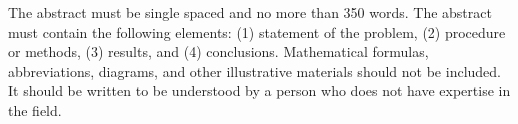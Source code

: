 The abstract must be single spaced and no more than 350 words. The abstract must contain the following elements: (1) statement of the problem, (2) procedure or methods, (3) results, and (4) conclusions. Mathematical formulas, abbreviations, diagrams, and other illustrative materials should not be included. It should be written to be understood by a person who does not have expertise in the field.
